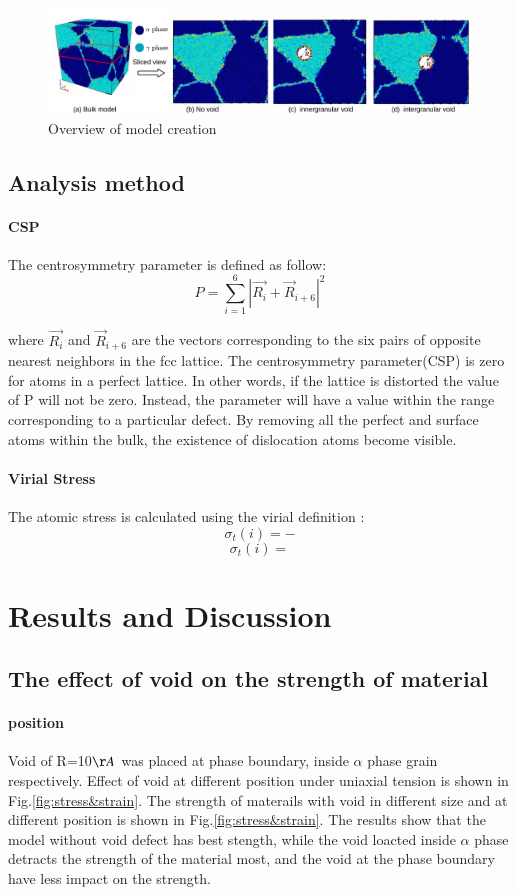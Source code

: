 \documentclass[times,12pt]{elsarticle}
\begin{document}
\begin{figure}[h]
	\centering
	\includegraphics[width=1\linewidth]{img/models}
	\caption{Overview of model creation}
	\label{fig:model-creation}
\end{figure}

\subsection{Analysis method}
\paragraph{CSP}
The centrosymmetry parameter is defined as follow:
\begin{equation} \label{eq:csp} 
	P = \displaystyle\sum_{i=1}^{6}|\vec{R_i}+{\vec{R}}_{i+6}|^2
\end{equation}

where $\vec{R_i}$ and ${\vec{R}}_{i+6}$ are the vectors corresponding to the six pairs of opposite nearest neighbors in the fcc lattice. The centrosymmetry parameter(CSP) is zero for atoms in a perfect lattice. In other words, if the lattice is distorted the value of P will not be zero. Instead, the parameter will have a value within the range corresponding to a particular defect. By removing all the perfect and surface atoms within the bulk, the existence of dislocation atoms become visible.
	
\paragraph{Virial Stress}
The atomic stress is calculated using the virial definition :
$$\sigma_t(i)=-$$
$$\sigma_t(i)= $$
   
\section{Results and Discussion}
\subsection{The effect of void on the strength of material}
\paragraph{position} Void of R=10$\AA$ was placed at phase boundary, inside $\alpha$ phase grain respectively. Effect of void at different position under uniaxial tension is shown in Fig.\ref{fig:stress&strain}. The strength of materails with void in different size and at different position is shown in Fig.\ref{fig:stress&strain}. The results show that the model without void defect has best stength, while the void loacted inside $\alpha$ phase detracts the strength of the material most, and the void at the phase boundary have less impact on the strength.
\end{document}
